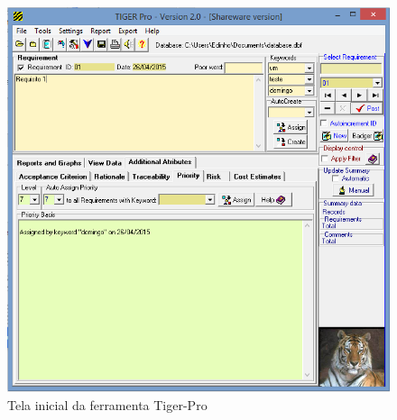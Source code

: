 \begin{figure}[!htb]
\centering
\includegraphics[scale=0.6]{figuras/tiger-pro.png}
\caption{Tela inicial da ferramenta Tiger-Pro}
\end{figure}


